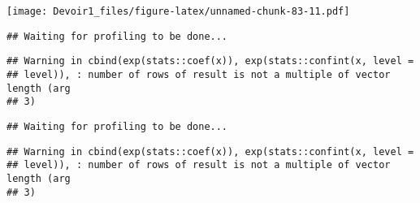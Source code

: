 \documentclass[]{article}
\newenvironment{Shaded}{\begin{snugshade}}{\end{snugshade}}
\newcommand{\KeywordTok}[1]{\textcolor[rgb]{0.13,0.29,0.53}{\textbf{#1}}}
\newcommand{\DataTypeTok}[1]{\textcolor[rgb]{0.13,0.29,0.53}{#1}}
\newcommand{\DecValTok}[1]{\textcolor[rgb]{0.00,0.00,0.81}{#1}}
\newcommand{\StringTok}[1]{\textcolor[rgb]{0.31,0.60,0.02}{#1}}
\newcommand{\OperatorTok}[1]{\textcolor[rgb]{0.81,0.36,0.00}{\textbf{#1}}}
\newcommand{\NormalTok}[1]{#1}
\begin{document}
\texttt{[image: Devoir1\_files/figure-latex/unnamed-chunk-83-11.pdf]}

\begin{Shaded}
\end{Shaded}

\begin{verbatim}
## Waiting for profiling to be done...
\end{verbatim}

\begin{verbatim}
## Warning in cbind(exp(stats::coef(x)), exp(stats::confint(x, level =
## level)), : number of rows of result is not a multiple of vector length (arg
## 3)
\end{verbatim}

\begin{verbatim}
## Waiting for profiling to be done...
\end{verbatim}

\begin{verbatim}
## Warning in cbind(exp(stats::coef(x)), exp(stats::confint(x, level =
## level)), : number of rows of result is not a multiple of vector length (arg
## 3)
\end{verbatim}
\end{document}
